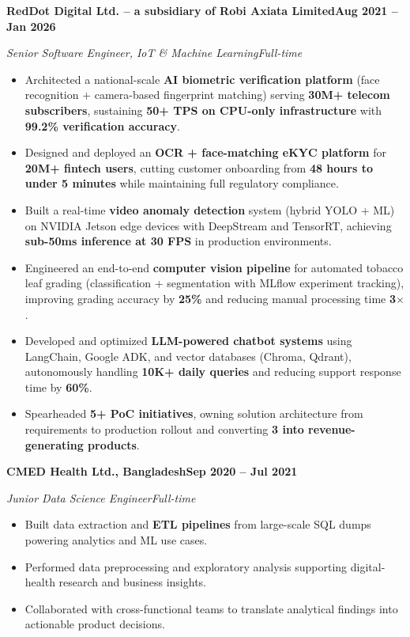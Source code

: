 \documentclass[10pt,a4paper]{article}
\begin{document}
\noindent\textbf{RedDot Digital Ltd. -- a subsidiary of Robi Axiata Limited}\hfill\textbf{Aug 2021 -- Jan 2026}\par
\textit{Senior Software Engineer, IoT \& Machine Learning}\hfill\textit{Full-time}\par
\vspace{0.2em}
\begin{itemize}
  \item Architected a national-scale \textbf{AI biometric verification platform} (face recognition + camera-based fingerprint matching) serving \textbf{30M+ telecom subscribers}, sustaining \textbf{50+ TPS on CPU-only infrastructure} with \textbf{99.2\% verification accuracy}.
  \item Designed and deployed an \textbf{OCR + face-matching eKYC platform} for \textbf{20M+ fintech users}, cutting customer onboarding from \textbf{48 hours to under 5 minutes} while maintaining full regulatory compliance.
  \item Built a real-time \textbf{video anomaly detection} system (hybrid YOLO + ML) on NVIDIA Jetson edge devices with DeepStream and TensorRT, achieving \textbf{sub-50ms inference at 30 FPS} in production environments.
  \item Engineered an end-to-end \textbf{computer vision pipeline} for automated tobacco leaf grading (classification + segmentation with MLflow experiment tracking), improving grading accuracy by \textbf{25\%} and reducing manual processing time \textbf{3$\times$}.
  \item Developed and optimized \textbf{LLM-powered chatbot systems} using LangChain, Google ADK, and vector databases (Chroma, Qdrant), autonomously handling \textbf{10K+ daily queries} and reducing support response time by \textbf{60\%}.
  \item Spearheaded \textbf{5+ PoC initiatives}, owning solution architecture from requirements to production rollout and converting \textbf{3 into revenue-generating products}.
\end{itemize}



\newpage
\noindent\textbf{CMED Health Ltd., Bangladesh}\hfill\textbf{Sep 2020 -- Jul 2021}\par
\textit{Junior Data Science Engineer}\hfill\textit{Full-time}\par
\vspace{0.2em}
\begin{itemize}
  \item Built data extraction and \textbf{ETL pipelines} from large-scale SQL dumps powering analytics and ML use cases.
  \item Performed data preprocessing and exploratory analysis supporting digital-health research and business insights.
  \item Collaborated with cross-functional teams to translate analytical findings into actionable product decisions.
\end{itemize}
\end{document}
